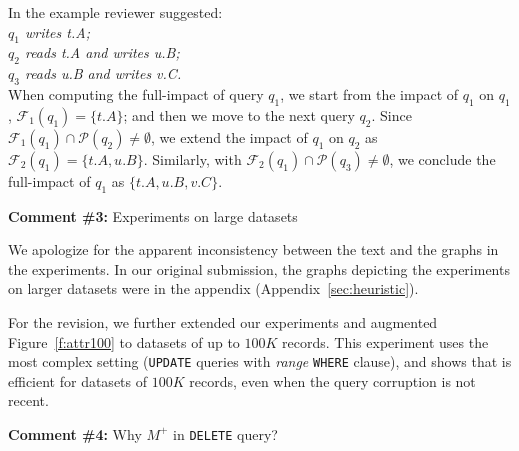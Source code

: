 \noindent In the example reviewer suggested:\\
\textit{\indent $q_1$ writes t.A; \\
\indent $q_2$ reads t.A and writes u.B; \\
\indent $q_3$ reads u.B and writes v.C.}\\
When computing the full-impact of query $q_1$, we start from the impact of $q_1$
on $q_1$, $\mathcal{F}_1(q_1) = \{t.A\}$; and then we move to the next query $q_2$. 
Since $\mathcal{F}_1(q_1)  \cap\mathcal{P}(q_2) \neq \emptyset$, we extend the impact 
of $q_1$ on $q_2$ as $\mathcal{F}_2(q_1) = \{t.A, u.B\}$. Similarly, with 
$\mathcal{F}_2(q_1)  \cap\mathcal{P}(q_3) \neq \emptyset$, we conclude the full-impact
of $q_1$ as $\{t.A, u.B, v.C\}$.


\comskip

\noindent
\textbf{Comment \#3:} Experiments on large datasets
\begin{quote}
\end{quote}

We apologize for the apparent inconsistency between the text and the graphs in
the experiments. In our original submission, the graphs depicting the
experiments on larger datasets were in the appendix
(Appendix~\ref{sec:heuristic}).

For the revision, we further extended our experiments and augmented
Figure~\ref{f:attr100} to datasets of up to $100K$ records. This experiment
uses the most complex setting (\texttt{UPDATE} queries with \textit{range}
\texttt{WHERE} clause), and shows that \sys is efficient for datasets of
$100K$ records, even when the query corruption is not recent.


\comskip

\noindent
\textbf{Comment \#4:} Why $M^+$ in \texttt{DELETE} query?
\begin{quote}
\end{quote}

